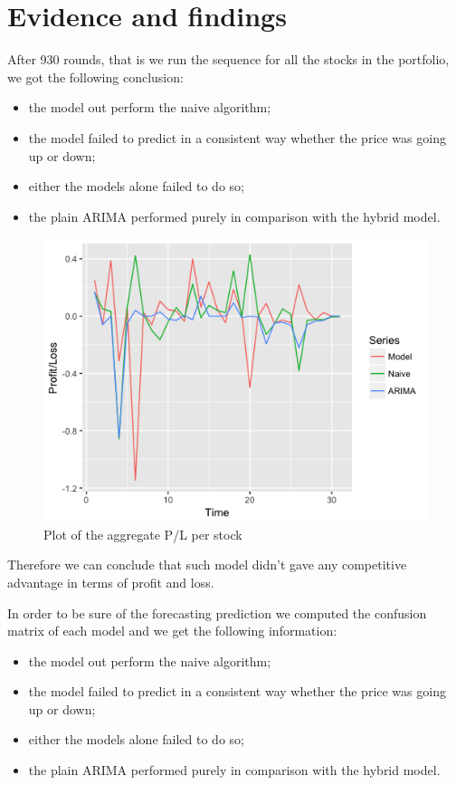 \documentclass[twocolumn]{article}
\begin{document}
\section{Evidence and findings}
After 930 rounds, that is we run the sequence for all the stocks in the portfolio, we got the following conclusion:
\begin{itemize}
    \item the model out perform the naive algorithm;
    \item the model failed to predict in a consistent way whether the price was going up or down;
    \item either the models alone failed to do so;
    \item the plain ARIMA performed purely in comparison with the hybrid model.
\end{itemize}

\begin{figure}
    \centering
    \includegraphics[width=1\linewidth, ]{Paper/images/PL_plot.png}
    \caption{Plot of the aggregate P/L per stock}
    \label{pl_portfolio}
\end{figure}

Therefore we can conclude that such model didn't gave any competitive advantage in terms of profit and loss.

In order to be sure of the forecasting prediction we computed the confusion matrix of each model and we get the following information:
\begin{itemize}
    \item the model out perform the naive algorithm;
    \item the model failed to predict in a consistent way whether the price was going up or down;
    \item either the models alone failed to do so;
    \item the plain ARIMA performed purely in comparison with the hybrid model.
\end{itemize}
\end{document}
